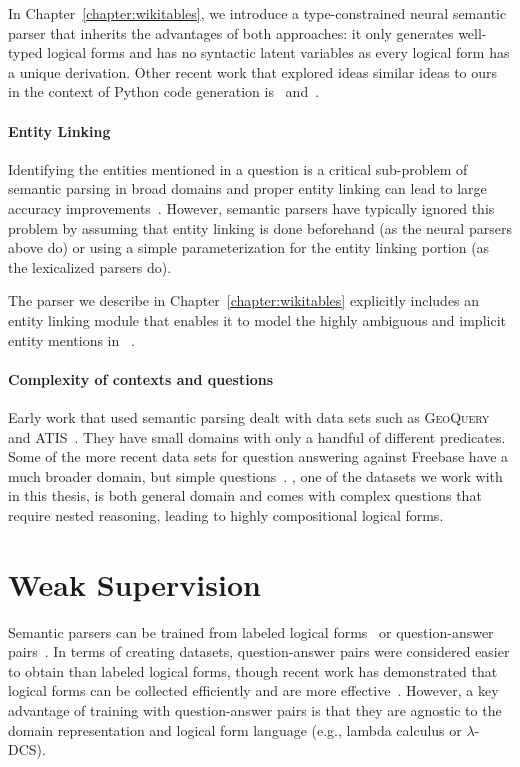 In Chapter~\ref{chapter:wikitables},  we introduce a type-constrained neural
semantic parser that inherits the advantages of both
approaches: it only generates well-typed logical forms and has no syntactic
latent variables as every logical form has a unique derivation. Other recent
work that explored ideas similar ideas to ours in the context of Python code
generation is~\cite{yin17acl} and~\cite{rabinovich17acl}.

\paragraph{Entity Linking} Identifying the entities mentioned in a question is a
critical sub-problem of semantic parsing in broad domains and proper entity
linking can lead to large accuracy improvements~\cite{yih2015stagg}.  However,
semantic parsers have typically ignored this problem by assuming that entity
linking is done beforehand (as the neural parsers above do) or using a simple
parameterization for the entity linking portion (as the lexicalized parsers
do).

The parser we describe in Chapter~\ref{chapter:wikitables} explicitly includes
an entity linking module that enables it to model the highly ambiguous and
implicit entity mentions in
\WTQ{}~\cite{pasupat2015compositional}.

\paragraph{Complexity of contexts and questions} Early work that used
semantic parsing dealt with data
sets such as \textsc{GeoQuery}~\citep{zelle1996} and
\textsc{ATIS}~\citep{dahl1994}.
They have small domains with only a handful of different predicates.
Some of the more recent data sets for question answering against Freebase have
a much broader domain, but simple questions~\citep{berant2013,cai2013}. \WTQ{},
one of the datasets we work with in this thesis, is both general domain and
comes with complex questions that require nested reasoning, leading to
highly compositional logical forms.

\section{Weak Supervision}\label{sec:weak_supervision}
Semantic parsers can be trained from labeled logical forms~\citep{zelle1996,zettlemoyer05}
or question-answer pairs~\citep{liang2011learning,berant2013}.
In terms of creating datasets, question-answer
pairs were considered easier to obtain than labeled logical forms, though recent work has
demonstrated that logical forms can be collected efficiently and are more
effective~\citep{yih2016value}. However, a key advantage of training with question-answer
pairs is that they are agnostic to the domain representation and logical form
language (e.g., lambda calculus or $\lambda$-DCS).


